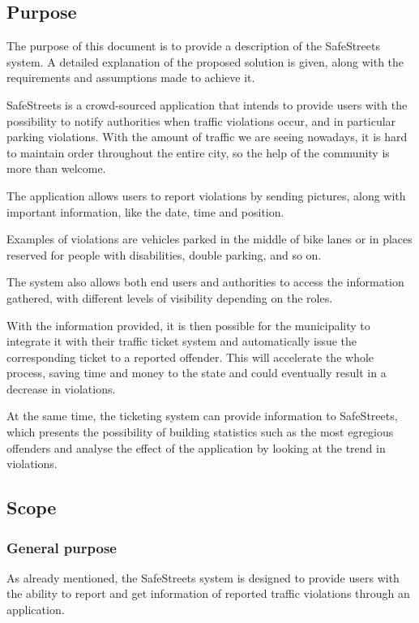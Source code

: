 \subsection{Purpose}

The purpose of this document is to provide a description of the SafeStreets system. A detailed explanation of the proposed solution is given, along with the requirements and assumptions made to achieve it.

SafeStreets is a crowd-sourced application that	 intends to provide users with the possibility to notify authorities when traffic violations occur, and in particular	 parking violations. With the amount of traffic we are seeing nowadays, it is hard to maintain order throughout the entire city, so the help of the community is more than welcome.

The application allows users to report violations by sending pictures, along with important information, like the date, time and position.

Examples of violations are vehicles parked in the middle of bike lanes or in places reserved for people with disabilities, double parking, and so on.

The system also allows both end users and authorities to access the information gathered, with different levels of visibility depending on the roles.

With the information provided, it is then possible for the municipality to integrate it with their traffic ticket system and automatically issue the corresponding ticket to a reported offender. This will accelerate the whole process, saving time and money to the state and could eventually result in a decrease in violations.

At the same time, the ticketing system can provide information to SafeStreets, which presents the possibility of building statistics such as the most egregious offenders and analyse the effect of the application by looking at the trend in violations.

\subsection{Scope}

\subsubsection{General purpose}

As already mentioned, the SafeStreets system is designed to provide users with the ability to report and get information of reported traffic violations through an application.

